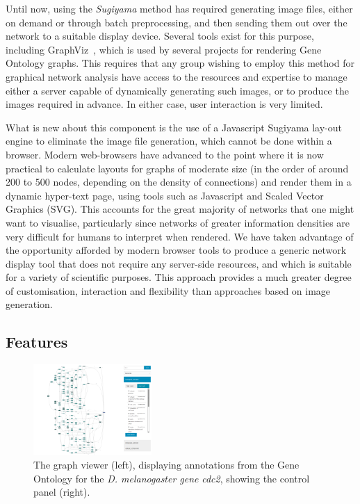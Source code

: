\documentclass[10pt,a4paper,twocolumn]{article}
\begin{document}
Until now, using the \emph{Sugiyama} method has required generating image files,
either on demand or through batch preprocessing, and then sending them out over the network to
a suitable display device. Several tools exist for this purpose, including
GraphViz~\cite{graphviz}, which is used by several projects for rendering Gene Ontology
graphs. This requires that any group wishing to employ this method for graphical
network analysis have access to the resources and expertise to manage either
a server capable of dynamically generating such images, or to produce the
images required in advance. In either case, user interaction is very limited.

What is new about this component is the use of a Javascript Sugiyama lay-out engine
to eliminate the image file generation, which cannot be done within a browser.
Modern web-browsers have advanced to the point where it is now practical to
calculate layouts for graphs of moderate size (in the order of around 200 to 500
nodes, depending on the density of connections) and render them in a dynamic hyper-text
page, using tools such as Javascript and Scaled Vector Graphics (SVG). This accounts
for the great majority of networks that one might want to visualise, particularly
since networks of greater information densities are very difficult for humans to
interpret when rendered. We have taken advantage of the opportunity afforded
by modern browser tools to produce a generic network display tool that does not require
any server-side resources, and which is suitable for a
variety of scientific purposes. This approach provides a much greater degree of customisation,
interaction and flexibility than approaches based on image generation.

\subsection*{Features}

\begin{figure}[htb]
\centering
\includegraphics[width=0.4\textwidth]{dagify.png}
\caption{
    \label{fig:1}
    The graph viewer (left), displaying annotations from the Gene Ontology for
    the \textit{D. melanogaster gene} \emph{cdc2}, showing the control panel (right).
}
\end{figure}
\end{document}
